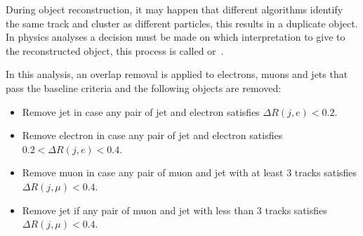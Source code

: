 During object reconstruction, it may happen that different algorithms identify
the same track and cluster as different particles, this results in a duplicate
object. In physics analyses a decision must be made on which interpretation to
give to the reconstructed object, this process is called
\gls{or}~\cite{Alison:1536507}.

In this analysis, an overlap removal is applied to electrons, muons and jets
that pass the baseline criteria and the following objects are removed:
\begin{itemize}
\item Remove jet in case any pair of jet and electron satisfies $\Delta R(j,
  e) < 0.2$.
\item Remove electron in case any pair of jet and electron satisfies $0.2 <
  \Delta R(j, e) < 0.4$.
\item Remove muon in case any pair of muon and jet with at least 3 tracks
  satisfies $\Delta R(j, \mu) < 0.4$.
\item Remove jet if any pair of muon and jet with less than 3 tracks satisfies
  $\Delta R(j, \mu) < 0.4$.
\end{itemize}
